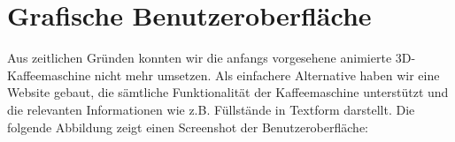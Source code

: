 \chapter{Grafische Benutzeroberfläche}\label{ch:gui}
Aus zeitlichen Gründen konnten wir die anfangs vorgesehene animierte 3D-Kaffeemaschine nicht mehr umsetzen.
Als einfachere Alternative haben wir eine Website gebaut, die sämtliche Funktionalität der Kaffeemaschine unterstützt und die relevanten Informationen wie z.B. Füllstände in Textform darstellt.
Die folgende Abbildung zeigt einen Screenshot der Benutzeroberfläche:
